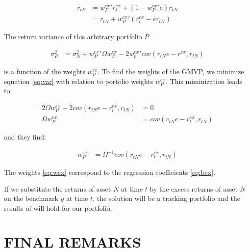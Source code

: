 \documentclass[12pt,oneside,a4paper]{memoir}
\begin{document}
\vspace{-18 pt}
\begin{align*}
r_{tP} &= w_{P}^{ex}'r_{t}^{ex} + (1- w_{P}^{ex}'e) r_{tN}
\\&=
r_{tN} + w_{P}^{ex}'(r_{t}^{ex} - e r_{tN})
\end{align*}

The return variance of this arbitrary portfolio $P$

\vspace{-18 pt}
\begin{align}
	\label{eq:var}
\sigma^{2}_{P} &=
\sigma^{2}_{N} + w_{P}^{ex}' \Omega w_{P}^{ex} - 2w_{p}^{ex}' cov(r_{tN}e - r^{ex},r_{tN})
\end{align}

\noindent
is a function of the weights $w_{P}^{ex}$.
To find the weights of the GMVP, we minimize equation \eqref{eq:var} with relation to portolio weights $w_{P}^{ex}$.
This miminization leads to:

\vspace{-18 pt}
\begin{align*}
2 \Omega w_{P}^{ex} - 2 cov(r_{tN}e-r_{t}^{ex}, r_{tN}) &= 0 
\\
\Omega w_{P}^{ex} &= cov(r_{tN}e-r_{t}^{ex}, r_{tN})
\end{align*}

\noindent
and they find:

\vspace{-18 pt}
\begin{align}
	\label{eq:wex}
w_{P}^{ex} &= \Omega^{-1} cov(r_{tN}e-r_{t}^{ex}, r_{tN})
\end{align}

The weights \eqref{eq:wex} correspond to the regression coefficients \eqref{eq:bex}.

If we substitute the returns of asset $N$ at time $t$ by the excess returns of asset $N$ on the benchmark $y$ at time $t$, the solution will be a tracking portfolio and the results of  will hold for our portfolio.

\section{FINAL REMARKS}\label{section:conclusion}
\end{document}
